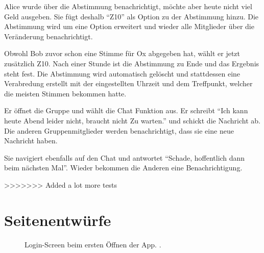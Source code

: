 \documentclass[parskip=full,11pt]{scrartcl}
\begin{document}
{Alice wurde über die Abstimmung benachrichtigt, möchte aber heute nicht viel Geld ausgeben.
Sie fügt deshalb \enquote{Z10} als Option zu der Abstimmung hinzu.}
{Die Abstimmung wird um eine Option erweitert und 
wieder alle Mitglieder über die Veränderung benachrichtigt.}

{Obwohl Bob zuvor schon eine Stimme für Ox abgegeben hat, wählt er jetzt zusätzlich Z10.}
{Nach einer Stunde ist die Abstimmung zu Ende und das Ergebnis steht fest.
Die Abstimmung wird automatisch gelöscht und stattdessen eine Verabredung erstellt mit der 
eingestellten Uhrzeit und dem Treffpunkt, welcher die meisten Stimmen bekommen hatte.}


{Er öffnet die Gruppe und wählt die Chat Funktion aus. Er schreibt \enquote{Ich kann heute Abend leider nicht, braucht nicht Zu warten.} und schickt die Nachricht ab.}
{Die anderen Gruppenmitglieder werden benachrichtigt, dass sie eine neue Nachricht haben.}

{Sie navigiert ebenfalls auf den Chat und antwortet \enquote{Schade, hoffentlich dann beim
nächsten Mal}.}
{Wieder bekommen die Anderen eine Benachrichtigung.}

>>>>>>> Added a lot more tests

\pagebreak
\appendix

\section{Seitenentwürfe}

\begin{figure}[hb]
	\caption{\label{fig:menu}
		Login-Screen beim ersten Öffnen der App.
		 .
	}
\end{figure}
\end{document}
